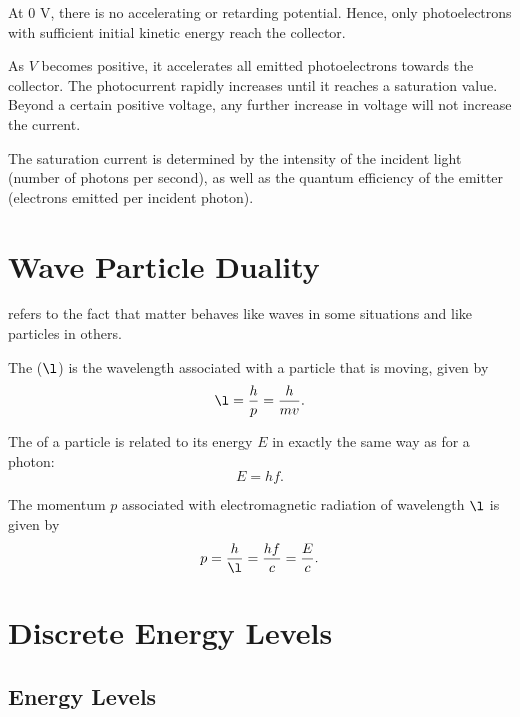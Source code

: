 At 0 V, there is no accelerating or retarding potential. Hence, only photoelectrons with sufficient initial kinetic energy reach the collector.

As $V$ becomes positive, it accelerates all emitted photoelectrons towards the collector. The photocurrent rapidly increases until it reaches a saturation value. Beyond a certain positive voltage, any further increase in voltage will not increase the current.

The saturation current is determined by the intensity of the incident light (number of photons per second), as well as the quantum efficiency of the emitter (electrons emitted per incident photon).

\section{Wave Particle Duality}

\begin{definition}
     refers to the fact that matter behaves like waves in some situations and like particles in others.
\end{definition}

\begin{definition}
    The  ($\l$) is the wavelength associated with a particle that is moving, given by \[\l = \frac{h}{p} = \frac{h}{mv}.\]
\end{definition}

\begin{definition}
    The  of a particle is related to its energy $E$ in exactly the same way as for a photon: \[E = hf.\]
\end{definition}

\begin{definition}
    The momentum $p$ associated with electromagnetic radiation of wavelength $\l$ is given by \[p = \frac{h}{\l} = \frac{hf}{c} = \frac{E}{c}.\]
\end{definition}

\section{Discrete Energy Levels}

\subsection{Energy Levels}

